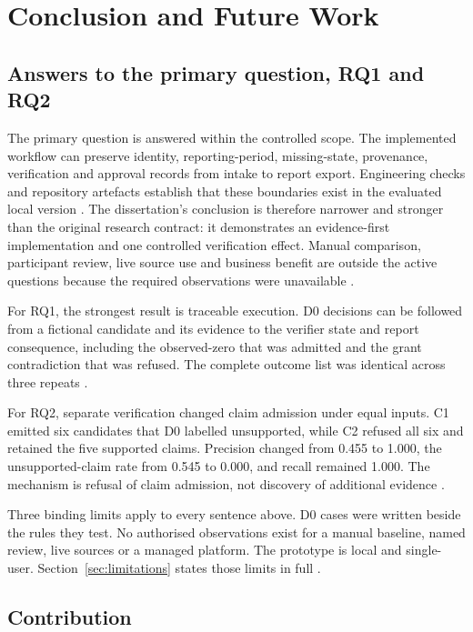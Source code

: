 \chapter{Conclusion and Future Work}
\section{Answers to the primary question, RQ1 and RQ2}

The primary question is answered within the controlled scope. The implemented workflow can preserve
identity, reporting-period, missing-state, provenance, verification and approval records from intake
to report export. Engineering checks and repository artefacts establish that these boundaries exist
in the evaluated local version \citep{hevner2004design,peffers2007dsrm}. The dissertation's conclusion
is therefore narrower and stronger than the original research contract: it demonstrates an
evidence-first implementation and one controlled verification effect. Manual comparison, participant
review, live source use and business benefit are outside the active questions because the required
observations were unavailable \citep{hevner2004design,pineau2021reproducibility}.

For RQ1, the strongest result is traceable execution. D0 decisions can be followed from a fictional
candidate and its evidence to the verifier state and report consequence, including the observed-zero
that was admitted and the grant contradiction that was refused. The complete outcome list was
identical across three repeats \citep{gao2023alce,gao2023rarr,pineau2021reproducibility}.

For RQ2, separate verification changed claim admission under equal inputs. C1 emitted six candidates
that D0 labelled unsupported, while C2 refused all six and retained the five supported claims.
Precision changed from 0.455 to 1.000, the unsupported-claim rate from 0.545 to 0.000, and recall
remained 1.000. The mechanism is refusal of claim admission, not discovery of additional evidence
\citep{gao2023alce,fu2026agents}.

Three binding limits apply to every sentence above. D0 cases were written beside the rules they test.
No authorised observations exist for a manual baseline, named review, live sources or a managed
platform. The prototype is local and single-user. Section~\ref{sec:limitations} states those limits
in full \citep{ribeiro2020checklist,kapoor2023leakage}.

\section{Contribution}

